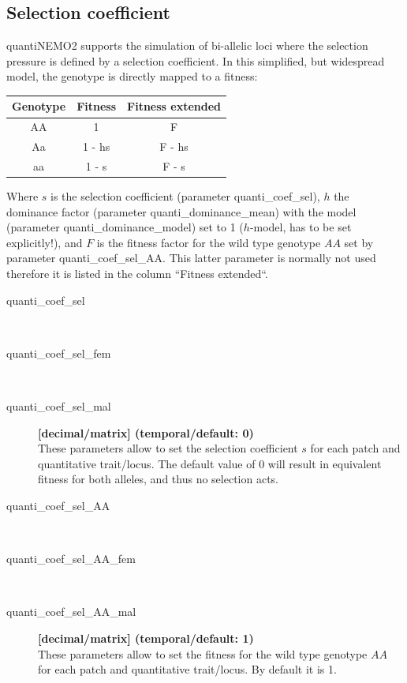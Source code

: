 \documentclass[letterpaper,12pt,oneside]{book}
\begin{document}
\subsection{Selection coefficient}
quantiNEMO2 supports the simulation of bi-allelic loci where the selection pressure is defined by a selection coefficient. In this simplified, but widespread model, the genotype is directly mapped to a fitness:\\

\begin{tabular}{ccc}
 \hline            
Genotype & Fitness & Fitness extended \\
\hline
AA & 1 			& F      \\
Aa & 1 - hs & F - hs \\
aa & 1 - s 	& F - s  \\
\hline
\end{tabular}

Where $s$ is the selection coefficient (parameter \textsf{quanti\_coef\_sel}), $h$ the dominance factor (parameter \textsf{quanti\_dominance\_mean}) with the model (parameter \textsf{quanti\_dominance\_model}) set to 1 ($h$-model, has to be set explicitly!), and $F$ is the fitness factor for the wild type genotype $AA$ set by parameter \textsf{quanti\_coef\_sel\_AA}. This latter parameter is normally not used therefore it is listed in the column ``Fitness extended``.
\begin{description}
\item[quanti\_coef\_sel]\hspace*{\fill}\\
\vspace{-9mm}
\item[quanti\_coef\_sel\_fem]\hspace*{\fill}\\
\vspace{-9mm}
\item[quanti\_coef\_sel\_mal]\textbf{[decimal/matrix] (temporal/default: 0)}\\
These parameters allow to set the selection coefficient $s$ for each patch and quantitative trait/locus. The default value of 0 will result in equivalent fitness for both alleles, and thus no selection acts.

\item[quanti\_coef\_sel\_AA]\hspace*{\fill}\\
\vspace{-9mm}
\item[quanti\_coef\_sel\_AA\_fem]\hspace*{\fill}\\
\vspace{-9mm}
\item[quanti\_coef\_sel\_AA\_mal]\textbf{[decimal/matrix] (temporal/default: 1)}\\
These parameters allow to set the fitness for the wild type genotype $AA$ for each patch and quantitative trait/locus. By default it is 1.
\end{description}
\end{document}
